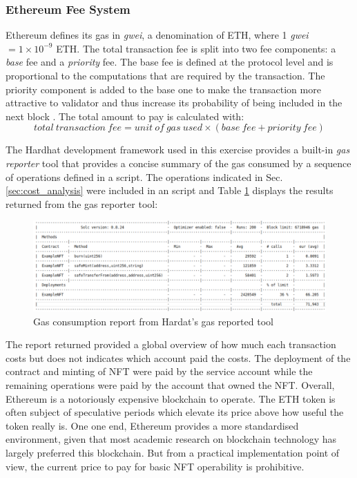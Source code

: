 \documentclass[../main.tex]{subfiles}
\begin{document}
\subsubsection{Ethereum Fee System}
Ethereum defines its gas in \textit{gwei}, a denomination of ETH, where 1 \textit{gwei} $ = 1 \times 10^{-9} $ ETH. The total transaction fee is split into two fee components: a \textit{base} fee and a \textit{priority} fee. The base fee is defined at the protocol level and is proportional to the computations that are required by the transaction. The priority component is added to the base one to make the transaction more attractive to validator and thus increase its probability of being included in the next block \cite{ethereum2024c}. The total amount to pay is calculated with:
$$
    total\: transaction\: fee = unit\: of\: gas\: used \times ( base\: fee + priority\: fee)
$$

The Hardhat development framework used in this exercise provides a built-in \textit{gas reporter} tool that provides a concise summary of the gas consumed by a sequence of operations defined in a script. The operations indicated in Sec. \ref{sec:cost_analysis} were included in an script and Table \ref{fig:solidity_gas_cost} displays the results returned from the gas reporter tool:

\begin{figure}[htp]
    \centering
    \includegraphics[width=1.0\textwidth]{../Images/11_solidity_fee_calculation.png}
    \caption{Gas consumption report from Hardat's gas reported tool}
    \label{fig:solidity_gas_cost}
\end{figure}

The report returned provided a global overview of how much each transaction costs but does not indicates which account paid the costs. The deployment of the contract and minting of NFT were paid by the service account while the remaining operations were paid by the account that owned the NFT. Overall, Ethereum is a notoriously expensive blockchain to operate. The ETH token is often subject of speculative periods which elevate its price above how useful the token really is. One one end, Ethereum provides a more standardised environment, given that most academic research on blockchain technology has largely preferred this blockchain. But from a practical implementation point of view, the current price to pay for basic NFT operability is prohibitive.
\end{document}
